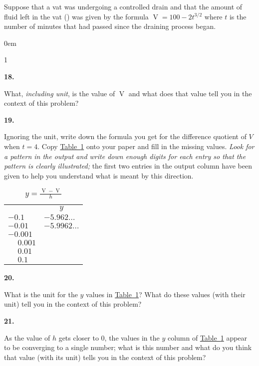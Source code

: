\documentclass[12pt,]{book}
\theoremstyle{plain}
\theoremstyle{definition}
\numberwithin{equation}{section}
\newcommand{\hrulemedium}{\noalign{\hrule height 0.07em}}
\newcommand{\hrulethick} {\noalign{\hrule height 0.11em}}
\newenvironment{exercisegroup}%
{\medskip\noindent}%
{\par\bigskip}%
\newlength{\exercisegroupindent}%
\newlength{\exercisegroupitemwidth}%
\newenvironment{exercisegrouplist}%
{\vspace{-\partopsep}%
\begin{adjustwidth}{\exercisegroupindent}{0em}}%
{\end{adjustwidth}%
\vspace{-\partopsep}%
\vspace{\baselineskip}}%
\newenvironment{exercisegroupbycol}[1]%
{\begin{exercisegrouplist}%
\vspace{-\multicolsep}%
\begin{multicols}{#1}%
\setlength{\parindent}{0em}%
\setlength{\exercisegroupitemwidth}{\linewidth}}%
{\end{multicols}%
\vspace{-\multicolsep}%
\end{exercisegrouplist}}%
\newenvironment{exercisegroupitem}[1]%
{\begin{minipage}[t]{\exercisegroupitemwidth}
\vspace{0pt}%
{\bfseries#1}%
\rule{0pt}{\baselineskip}}{\strut%
\end{minipage}%
\hspace{\columnsep}}%
\providecommand\phantomsection{}
\newcommand{\fe}[2]{\mathop{{#1}{\left(#2\right)}}}
\begin{document}
\begin{exercisegroup}%
Suppose that a vat was undergoing a controlled drain and that the amount of fluid left in the vat (\si{\gallon}) was given by the formula \(\fe{V}{t}=100-2t^{3/2}\) where \(t\) is the number of minutes that had passed since the draining process began.%
\begin{exercisegroupbycol}{1}%
\begin{exercisegroupitem}{18. }\phantomsection\hypertarget{exercise-vat-first}{\null}
What, \emph{including unit}, is the value of \(\fe{V}{4}\) and what does that value tell you in the context of this problem?%
\end{exercisegroupitem}%
\par%
\begin{exercisegroupitem}{19. }\phantomsection\hypertarget{exercise-27}{\null}
Ignoring the unit, write down the formula you get for the difference quotient of \(V\) when \(t=4\). Copy \hyperref[table-vat]{Table~\ref*{table-vat}} onto your paper and fill in the missing values. \emph{Look for a pattern in the output and write down enough digits for each entry so that the pattern is clearly illustrated;} the first two entries in the output column have been given to help you understand what is meant by this direction.%
\begin{table}
\centering
\caption{\(y=\frac{\fe{V}{4+h}-\fe{V}{4}}{h}\)\label{table-vat}}
\begin{tabular}{ll}\hrulethick
\multicolumn{1}{c}{\(h\)}&\multicolumn{1}{c}{\(y\)}\\\hrulemedium
\(-0.1\)&\(-5.962\ldots\)\\
\(-0.01\)&\(-5.9962\ldots\)\\
\(-0.001\)&\\
\(\phantom{-}0.001\)&\\
\(\phantom{-}0.01\)&\\
\(\phantom{-}0.1\)&
\end{tabular}
\end{table}
\end{exercisegroupitem}%
\par%
\begin{exercisegroupitem}{20. }\phantomsection\hypertarget{exercise-28}{\null}
What is the unit for the \(y\) values in \hyperref[table-vat]{Table~\ref*{table-vat}}? What do these values (with their unit) tell you in the context of this problem?%
\end{exercisegroupitem}%
\par%
\begin{exercisegroupitem}{21. }\phantomsection\hypertarget{exercise-vat-last}{\null}
As the value of \(h\) gets closer to \(0\), the values in the \(y\) column of \hyperref[table-vat]{Table~\ref*{table-vat}} appear to be converging to a single number; what is this number and what do you think that value (with its unit) tells you in the context of this problem?%
\end{exercisegroupitem}%
\par%
\end{exercisegroupbycol}%
\end{exercisegroup}%
\typeout{************************************************}
\typeout{************************************************}
\end{document}
